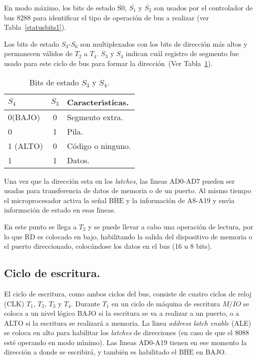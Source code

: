 En modo m\'aximo, los bits de estado $\overline{\mbox{S0}}$, $\overline{S_{1}}$ y %
$\overline{S_{2}}$ son usados por el controlador de bus 8288 para identificar el tipo de %
operaci\'on de bus a realizar (ver Tabla~\ref{statusbits1}).

Los bits de estado $S_{3}$-$S_{6}$ son multiplexados con los bits de direcci\'on m\'as altos %
y permanecen v\'alidos de $T_{2}$ a $T_{4}$. $S_{3}$ y $S_{4}$ indican cu\'al registro de %
segmento fue usado para este ciclo de bus para formar la direcci\'on~(Ver %
Tabla~\ref{statusbits2}).

\begin{table}[!htb]
\centering
\begin{tabular}{|l|c|l|} \hline
$S_{4}$ & $S_{3}$ & Caracter\'{\i}sticas. \\ \hline
0(BAJO) & 0 & Segmento extra. \\
0       & 1 & Pila. \\
1 (ALTO) & 0 & C\'odigo o ninguno. \\
1       & 1 & Datos. \\ \hline
\end{tabular}
\caption{Bits de estado $S_{3}$ y $S_{4}$.}
\label{statusbits2}
\end{table}

Una vez que la direcci\'on esta en los {\em latches}, las l\'{\i}neas AD0-AD7 pueden ser %
usadas para transferencia de datos de memoria o de un puerto. Al mismo tiempo el microprocesador %
activa la se\~nal $\overline{\mbox{BHE}}$ y la informaci\'on de A8-A19 y env\'{\i}a %
informaci\'on de estado en esas l\'{\i}neas.

En este punto se llega a $T_{2}$ y se puede llevar a cabo una operaci\'on de lectura, por lo %
que $\overline{\mbox{RD}}$ es colocado en bajo, habilitando la salida del dispositivo de %
memoria o el puerto direccionado, coloc\'andose los datos en el bus (16 u 8 bits).


\subsection{Ciclo de escritura.}
\label{Subsection:cicloescritura}

El ciclo de escritura, como ambos ciclos del bus, consiste de cuatro ciclos de reloj (CLK) %
$T_{1}$, $T_{2}$, $T_{3}$ y $T_{4}$. Durante $T_{1}$ en un ciclo de m\'aquina de escritura %
$M/\overline{IO}$ se coloca a un nivel l\'ogico BAJO si la escritura se va a realizar a un %
puerto, o a ALTO si la escritura se realizar\'a a memoria. La l\'{\i}nea {\em address latch %
enable\/} (ALE) se coloca en alto para habilitar los {\em latches} de direcciones (en caso de %
que el 8088 est\'e operando en modo m\'{\i}nimo). Las l\'{\i}neas AD0-A19 tienen en ese %
momento la direcci\'on a donde se escribir\'a, y tambi\'en es habilitado el %
$\overline{\mbox{BHE}}$ en BAJO. 

